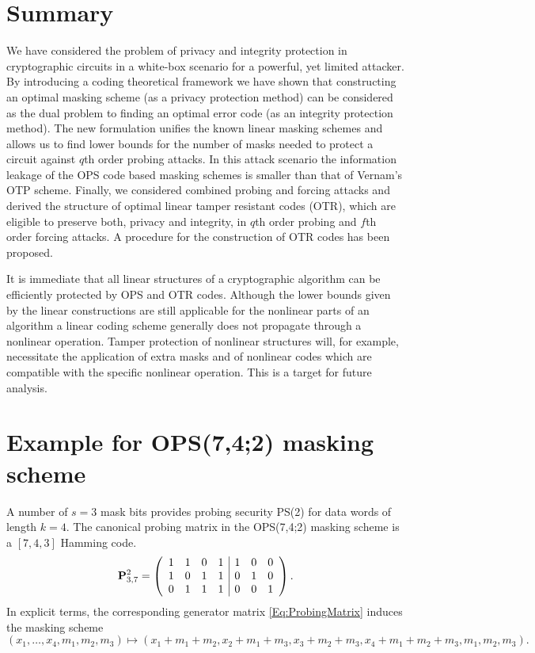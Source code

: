 \documentclass[11pt]{llncs}
\newcommand{\BE}{\begin{equation}}      \newcommand{\EE}{\end{equation}}
\begin{document}
\section{Summary}
We have considered the problem of privacy and integrity protection
in cryptographic circuits in a white-box scenario
for a powerful, yet limited attacker.
By introducing a coding theoretical framework
we have shown that constructing an optimal masking scheme
(as a privacy protection method)
can be considered as the dual problem to finding an optimal error code
(as an integrity protection method).
The new formulation
unifies the known linear masking schemes and
allows us to find
lower bounds for the number of masks needed
to protect a circuit against $q$th order probing attacks.
In this attack scenario the information leakage of
the OPS code based masking
schemes is smaller
than that of Vernam's OTP scheme.
Finally, we considered combined probing and forcing attacks
and derived the structure of optimal linear tamper resistant codes (OTR),
which are eligible to preserve both, privacy and integrity,
in $q$th order probing and $f$th order forcing attacks.
A procedure for the construction of OTR codes has been proposed.

It is immediate that all linear structures of a cryptographic algorithm
can be efficiently protected by OPS and OTR codes.
Although the lower bounds given by the linear constructions
are still applicable for the nonlinear parts of an algorithm
a linear coding scheme generally does not propagate through
a nonlinear operation. Tamper protection of nonlinear
structures will, for example, necessitate the application
of extra masks and of nonlinear codes which are compatible
with the specific nonlinear operation.
This is a target for future analysis.

\clearpage



\appendix
\section{Example for OPS(7,4;2) masking scheme}\label{App:OPS_Example1}
A number of $s=3$ mask bits provides probing security PS(2) for data words
of length $k=4$. The canonical probing matrix in the OPS(7,4;2)
masking scheme is a $[7,4,3]$ Hamming code.
\BE
\V P^2_{3,7}=
  \left(\begin{array}{cccc|ccc}
    1 & 1 & 0 & 1 & 1 & 0 & 0 \\
    1 & 0 & 1 & 1 & 0 & 1 & 0 \\
    0 & 1 & 1 & 1 & 0 & 0 & 1
  \end{array}\right).
\EE
In explicit terms, the corresponding generator matrix \eqref{Eq:ProbingMatrix}
induces the masking scheme
\[
    (x_1,\dots,x_4, m_1,m_2,m_3) \mapsto
    (x_1+m_1+m_2,x_2+m_1+m_3,x_3+m_2+m_3,x_4+m_1+m_2+m_3,m_1,m_2,m_3).
\]
\end{document}
